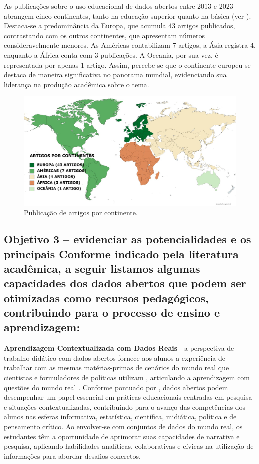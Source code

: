 \documentclass[portuguese]{textolivre}
\begin{document}
As publicações sobre o uso educacional de dados abertos entre 2013 e 2023 abrangem cinco continentes, tanto na educação superior quanto na básica (ver ). Destaca-se a predominância da Europa, que acumula 43 artigos publicados, contrastando com os outros continentes, que apresentam números consideravelmente menores. As Américas contabilizam 7 artigos, a Ásia registra 4, enquanto a África conta com 3 publicações. A Oceania, por sua vez, é representada por apenas 1 artigo. Assim, percebe-se que o continente europeu se destaca de maneira significativa no panorama mundial, evidenciando sua liderança na produção acadêmica sobre o tema.

\begin{figure}[h]
\centering
\begin{minipage}{0.75\linewidth}
\includegraphics[width=\linewidth]{Fig6.png}
\caption{Publicação de artigos por continente.}
\label{fig6}
\end{minipage}
\end{figure}

\subsection{Objetivo 3 – evidenciar as potencialidades e os principais Conforme indicado pela literatura acadêmica, a seguir listamos algumas capacidades dos dados abertos que podem ser otimizadas como recursos pedagógicos, contribuindo para o processo de ensino e aprendizagem:}

\textbf{Aprendizagem Contextualizada com Dados Reais} - a perspectiva de trabalho didático com dados abertos fornece aos alunos a experiência de trabalhar com as mesmas matérias-primas de cenários do mundo real que cientistas e formuladores de políticas utilizam \cite{atenas2015,kukulska-hulme2020}, articulando a aprendizagem com questões do mundo real \cite{kasl1997,barron1998,hmelo2004,davies2010}. Conforme pontuado por \textcite{atenas2015}, dados abertos podem desempenhar um papel essencial em práticas educacionais centradas em pesquisa e situações contextualizadas, contribuindo para o avanço das competências dos alunos nas esferas informativa, estatística, científica, midiática, política e de pensamento crítico. Ao envolver-se com conjuntos de dados do mundo real, os estudantes têm a oportunidade de aprimorar suas capacidades de narrativa e pesquisa, aplicando habilidades analíticas, colaborativas e cívicas na utilização de informações para abordar desafios concretos.
\end{document}
